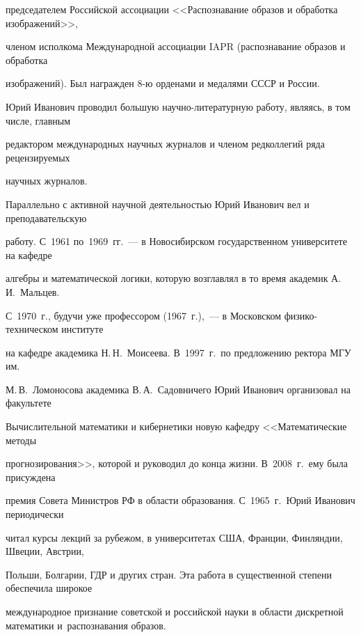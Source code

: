председателем Российской ассоциации <<Распознавание образов и обработка изображений>>, 


членом исполкома Международной ассоциации IAPR (распознавание образов и обработка 


изображений). Был награжден 8-ю орденами и медалями СССР и России.





Юрий Иванович проводил большую научно-литературную работу, являясь, в том числе, главным 


редактором международных научных журналов и членом редколлегий ряда рецензируемых 


научных журналов. 








Параллельно с активной научной деятельностью Юрий Иванович вел и преподавательскую 


работу. С~1961 по~1969~гг.~--- в Новосибирском государственном университете на кафедре 


алгебры и математической логики, которую возглавлял в то время академик А.\,И.~Мальцев. 


С~1970~г., будучи уже профессором (1967~г.),~--- в Московском физико-техническом институте 


на кафедре академика Н.\,Н.~Моисеева. В~1997~г.\ по предложению ректора МГУ им.\ 


М.\,В.~Ломоносова академика В.\,А.~Садовничего Юрий Иванович организовал на факультете 


Вычислительной математики и кибернетики новую кафедру <<Математические методы 


прогнозирования>>, которой и руководил до конца жизни. В~2008~г.\ ему была присуждена 


премия Совета Министров РФ в области образования. С~1965~г.\ Юрий Иванович периодически 


читал курсы лекций за рубежом, в университетах США, Франции, Финляндии, Швеции, Австрии, 


Польши, Болгарии, ГДР и других стран. Эта работа в существенной степени обеспечила широкое 


международное признание советской и российской науки в области дискретной математики и~распознавания образов. 







